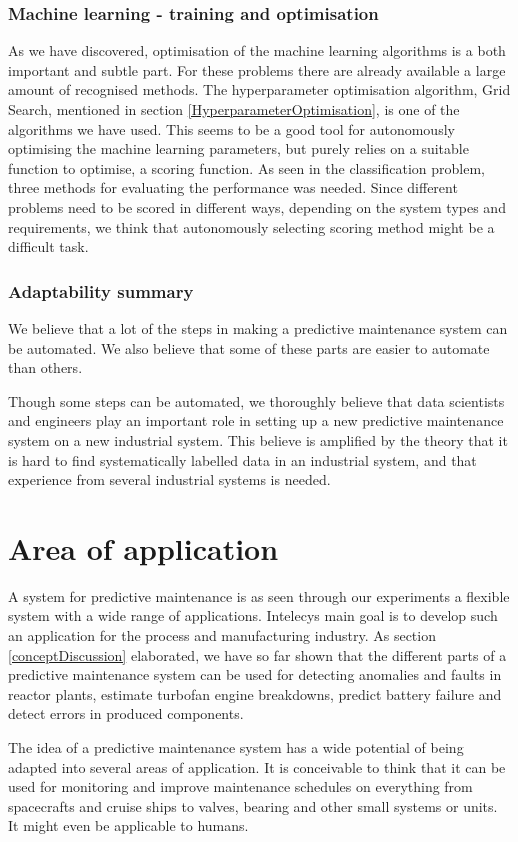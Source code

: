 \documentclass[english, a4paper]{report}
\begin{document}
{{{            \subsubsection{Machine learning - training and optimisation}
            {
                As we have discovered, optimisation of the machine learning algorithms is a both important and subtle part. For these problems there are already available a large amount of recognised methods. The hyperparameter optimisation algorithm, Grid Search, mentioned in section \ref{HyperparameterOptimisation}, is one of the algorithms we have used. This seems to be a good tool for autonomously optimising the machine learning parameters, but purely relies on a suitable function to optimise, a scoring function. As seen in the classification problem, three methods for evaluating the performance was needed. Since different problems need to be scored in different ways, depending on the system types and requirements, we think that autonomously selecting scoring method might be a difficult task. 
            }
            
            \subsubsection{Adaptability summary}
            {
                We believe that a lot of the steps in making a predictive maintenance system can be automated. We also believe that some of these parts are easier to automate than others.  
                \par
                Though some steps can be automated, we thoroughly believe that data scientists and engineers play an important role in setting up a new predictive maintenance system on a new industrial system. This believe is amplified by the theory that it is hard to find systematically labelled data in an industrial system, and that experience from several industrial systems is needed. 
            }
        }
    }
    
    \section{Area of application} 
    {
        A system for predictive maintenance is as seen through our experiments a flexible system with a wide range of applications. Intelecys main goal is to develop such an application for the process and manufacturing industry. As section \ref{conceptDiscussion} elaborated, we have so far shown that the different parts of a predictive maintenance system can be used for detecting anomalies and faults in reactor plants, estimate turbofan engine breakdowns, predict battery failure and detect errors in produced components. 
        \par 
        The idea of a predictive maintenance system has a wide potential of being adapted into several areas of application. It is conceivable to think that it can be used for monitoring and improve maintenance schedules on everything from spacecrafts and cruise ships to valves, bearing and other small systems or units. It might even be applicable to humans.   
    }
    
}
\end{document}
